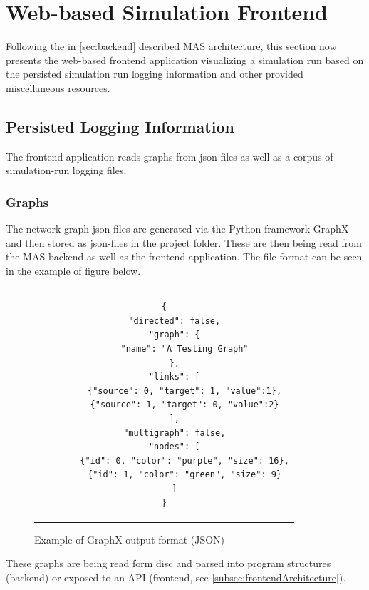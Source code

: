 \section{Web-based Simulation Frontend}\label{sec:frontend}

Following the in \autoref{sec:backend} described MAS architecture, this section now presents the web-based frontend application visualizing a simulation run based on the persisted simulation run logging information and other provided miscellaneous resources. 


\subsection{Persisted Logging Information}

The frontend application reads graphs from json-files as well as a corpus of simulation-run logging files.


\subsubsection{Graphs}\label{subsubsec:graphs}

The network graph json-files are generated via the Python framework GraphX and then stored as json-files in the project folder. These are then being read from the MAS backend as well as the frontend-application. The file format can be seen in the example of figure below.

\begin{figure}[thp]
    \centering
    \lstset{language=json, frame=single, linewidth=11cm}
    \begin{tabular}{c}
        \begin{lstlisting}
{
    "directed": false,
    "graph": {
        "name": "A Testing Graph"
    },
    "links": [
        {"source": 0, "target": 1, "value":1},
        {"source": 1, "target": 0, "value":2}
    ],
    "multigraph": false,
    "nodes": [
        {"id": 0, "color": "purple", "size": 16},
        {"id": 1, "color": "green", "size": 9}
    ]
}
        \end{lstlisting}
    \end{tabular}
    \caption{Example of GraphX output format (JSON)}
    \label{fig:graphx}
\end{figure}

These graphs are being read form disc and parsed into program structures (backend) or exposed to an API (frontend, see \autoref{subsec:frontendArchitecture}).

